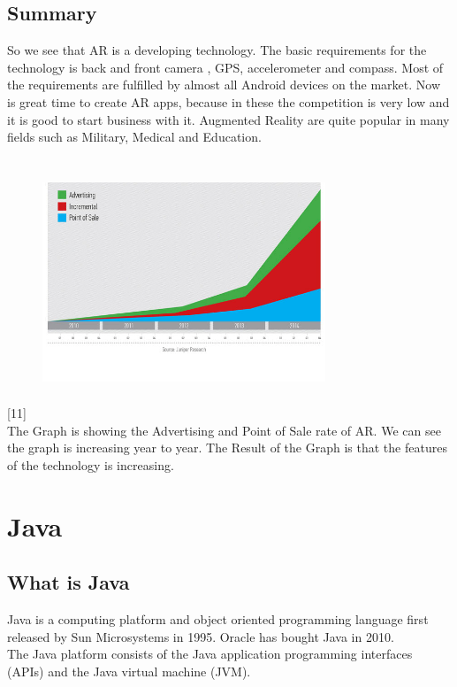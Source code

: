 \subsection{Summary}
So we see that AR is a developing technology. The basic requirements for the technology is back and front camera , GPS, accelerometer and compass. Most of the requirements are fulfilled by almost all Android devices on the market. Now is great time to create AR apps, because in these the competition is very low and it is good to start business with it. Augmented Reality are quite popular in many fields such as Military, Medical and Education.
\\
\\
\begin{figure}[htbp]
\centering
\includegraphics[width=240pt,height=180pt,keepaspectratio]{graphics/statistics.png}
\caption{\cite{javaObjectClass}}
\end{figure}
[11]
\\
The Graph is showing the Advertising and Point of Sale rate of AR. We can see the graph is increasing year to year. The Result of the Graph is that the features of the technology is increasing.

\section{Java}
\subsection{What is Java}
Java is a computing platform and object oriented programming language first released by Sun Microsystems in 1995. Oracle has bought Java in 2010.\cite{JavaWhat}
\\



The Java platform consists of the Java application programming interfaces (APIs) and the Java virtual machine (JVM).
\\



